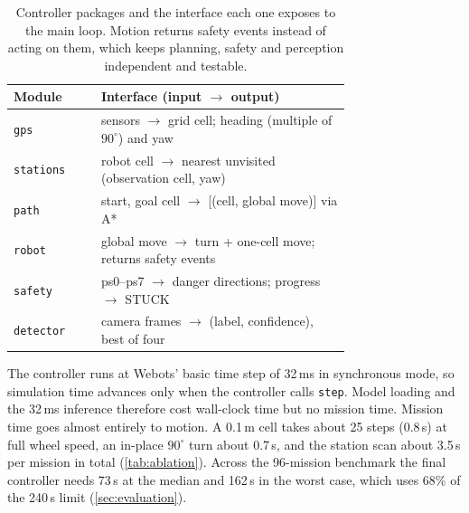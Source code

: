 \begin{table}[tbp]
  \centering\small
  \setlength{\tabcolsep}{3pt}
  \begin{tabular}{@{}l>{\raggedright\arraybackslash}p{0.74\linewidth}@{}}
    \toprule
    Module & Interface (input $\rightarrow$ output) \\
    \midrule
    \texttt{gps}      & sensors $\rightarrow$ grid cell; heading (multiple of $90^\circ$) and yaw \\
    \texttt{stations} & robot cell $\rightarrow$ nearest unvisited (observation cell, yaw) \\
    \texttt{path}     & start, goal cell $\rightarrow$ [(cell, global move)] via A* \\
    \texttt{robot}    & global move $\rightarrow$ turn + one-cell move; returns safety events \\
    \texttt{safety}   & ps0--ps7 $\rightarrow$ danger directions; progress $\rightarrow$ STUCK \\
    \texttt{detector} & camera frames $\rightarrow$ (label, confidence), best of four \\
    \bottomrule
  \end{tabular}
  \caption{Controller packages and the interface each one exposes to the main loop. Motion returns safety events instead of acting on them, which keeps planning, safety and perception independent and testable.}
  \label{tab:modules}
\end{table}

The controller runs at Webots' basic time step of 32\,ms in synchronous mode, so simulation time advances only when the controller calls \texttt{step}. Model loading and the 32\,ms inference therefore cost wall-clock time but no mission time. Mission time goes almost entirely to motion. A 0.1\,m cell takes about 25 steps (0.8\,s) at full wheel speed, an in-place $90^\circ$ turn about 0.7\,s, and the station scan about 3.5\,s per mission in total (\cref{tab:ablation}). Across the 96-mission benchmark the final controller needs 73\,s at the median and 162\,s in the worst case, which uses 68\% of the 240\,s limit (\cref{sec:evaluation}).
